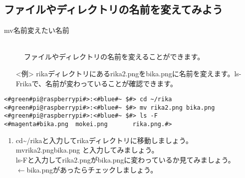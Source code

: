 \subsection{ファイルやディレクトリの名前を変えてみよう}
\begin{description}
\item[mv\textvisiblespace 名前\textvisiblespace 変えたい名前]\mbox{}\\
ファイルやディレクトリの名前を変えることができます。
\end{description}
\begin{itemize}
\item[<例>]rikaディレクトリにあるrika2.pngをbika.pngに名前を変えます。ls\textvisiblespace -F\textvisiblespace rikaで、名前が変わっていることが確認できます。
\end{itemize}
\begin{lstlisting}[caption=mvNameの例, label=mvName]
<#green#pi@raspberrypi#>:<#blue#~ $#> cd ~/rika
<#green#pi@raspberrypi#>:<#blue#~ $#> mv rika2.png bika.png
<#green#pi@raspberrypi#>:<#blue#~ $#> ls -F
<#magenta#bika.png	mokei.png		rika.png.#>
\end{lstlisting}

\begin{tcolorbox}[title=\useOmetoi]
\begin{enumerate}
\item cd\textvisiblespace\textasciitilde /rikaと入力してrikaディレクトリに移動しましょう。\\
mv\textvisiblespace rika2.png\textvisiblespace bika.png と入力してみましょう。\\
ls\textvisiblespace -Fと入力してrika2.pngがbika.pngに変わっているか見てみましょう。\\
\fbox{\phantom{白}} $\leftarrow$bika.pngがあったらチェックしましょう。
\end{enumerate}
\end{tcolorbox}
